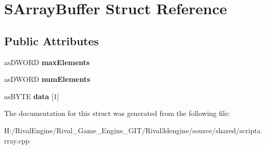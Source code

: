 \hypertarget{struct_s_array_buffer}{}\section{S\+Array\+Buffer Struct Reference}
\label{struct_s_array_buffer}
\subsection*{Public Attributes}
\begin{DoxyCompactItemize}
\item 
\mbox{\label{struct_s_array_buffer_a2fdadb8bcb98f31afef96ebae0268342}} 
as\+D\+W\+O\+RD {\bfseries max\+Elements}
\item 
\mbox{\label{struct_s_array_buffer_a3ca99d5f10b6c1f485b4c4edfbd152af}} 
as\+D\+W\+O\+RD {\bfseries num\+Elements}
\item 
\mbox{\label{struct_s_array_buffer_a92caaa90078f3976cd6f61f109ce40f0}} 
as\+B\+Y\+TE {\bfseries data} \mbox{[}1\mbox{]}
\end{DoxyCompactItemize}


The documentation for this struct was generated from the following file\+:\begin{DoxyCompactItemize}
\item 
H\+:/\+Rival\+Engine/\+Rival\+\_\+\+Game\+\_\+\+Engine\+\_\+\+G\+I\+T/\+Rival3dengine/source/shared/scriptarray.\+cpp\end{DoxyCompactItemize}
